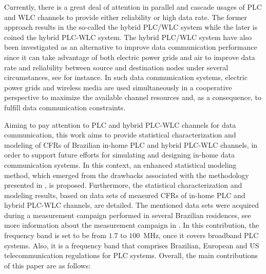 \documentclass[journal]{IEEEtran}
\begin{document}
Currently, there is a great deal of attention in parallel and cascade usages of \ac{PLC} and \ac{WLC} channels to provide either reliability or high data rate. The former approach results in the so-called the hybrid \ac{PLC}/\ac{WLC} system while the later is coined the hybrid \ac{PLC}-\ac{WLC} system. The hybrid \ac{PLC}/\ac{WLC} system have also been investigated as an alternative to improve data communication performance \cite{Victor2017,Sayed2014} since it can take advantage of both electric power grids and air to improve data rate and reliability between source and destination nodes under several circumstances, see \cite{Dib} for instance. In such data communication systems, electric power grids and wireless media are used simultaneously in a cooperative perspective to maximize the available channel resources and, as a consequence, to fulfill data communication constraints.

Aiming to pay attention to \ac{PLC} and hybrid \ac{PLC}-\ac{WLC} channels for data communication, this work aims to provide statistical characterization and modeling of \acp{CFR} of Brazilian in-home \ac{PLC} and hybrid \ac{PLC}-\ac{WLC} channels, in order to support future efforts for simulating and designing in-home data communication systems. In this context, an enhanced statistical modeling method, which emerged from the drawbacks associated with the methodology presented in \cite{Luis:AI,Luis:doc}, is proposed. Furthermore, the statistical characterization and modeling results, based on data sets of measured \acp{CFR} of in-home \ac{PLC} and hybrid \ac{PLC}-\ac{WLC} channels, are detailed. The mentioned data sets were acquired during a measurement campaign performed in several Brazilian residences, see more information about the measurement campaign in \cite{Thiago:Characterization,thiago:hyb,thiago:hyb2,thiago:doc}. In this contribution, the frequency band is set to be from $1.7$ to $100$~MHz, once it covers broadband \ac{PLC} systems. Also, it is a frequency band that comprises Brazilian, European and US telecommunication regulations for \ac{PLC} systems. Overall, the main contributions of this paper are as follows:
\end{document}
